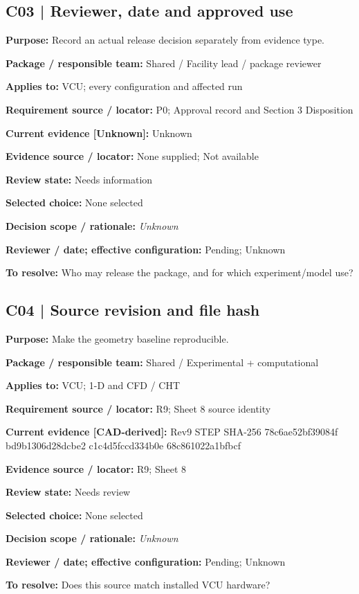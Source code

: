 \documentclass[11pt]{article}
\begin{document}
\par\noindent\begin{minipage}{\textwidth}\small\setlength{\parskip}{2pt}
\subsection*{C03 | Reviewer, date and approved use}
\textbf{Purpose:} Record an actual release decision separately from evidence type.\par
\textbf{Package / responsible team:} Shared / Facility lead / package reviewer\par
\textbf{Applies to:} VCU; every configuration and affected run\par
\textbf{Requirement source / locator:} P0; Approval record and Section 3 Disposition\par
\textbf{Current evidence [Unknown]:} Unknown\par
\textbf{Evidence source / locator:} None supplied; Not available\par
\textbf{Review state:} Needs information\par
\textbf{Selected choice:} None selected\par
\textbf{Decision scope / rationale:} \textit{Unknown}\par
\textbf{Reviewer / date; effective configuration:} Pending; Unknown\par
\textbf{To resolve:} Who may release the package, and for which experiment/model use?\par
\end{minipage}\par\vspace{5pt}
\par\noindent\begin{minipage}{\textwidth}\small\setlength{\parskip}{2pt}
\subsection*{C04 | Source revision and file hash}
\textbf{Purpose:} Make the geometry baseline reproducible.\par
\textbf{Package / responsible team:} Shared / Experimental + computational\par
\textbf{Applies to:} VCU; 1-D and CFD / CHT\par
\textbf{Requirement source / locator:} R9; Sheet 8 source identity\par
\textbf{Current evidence [CAD-derived]:} Rev9 STEP SHA-256 78c6ae52bf39084f bd9b1306d28dcbe2 c1c4d5fccd334b0e 68c861022a1bfbcf\par
\textbf{Evidence source / locator:} R9; Sheet 8\par
\textbf{Review state:} Needs review\par
\textbf{Selected choice:} None selected\par
\textbf{Decision scope / rationale:} \textit{Unknown}\par
\textbf{Reviewer / date; effective configuration:} Pending; Unknown\par
\textbf{To resolve:} Does this source match installed VCU hardware?\par
\end{minipage}\par\vspace{5pt}
\end{document}
